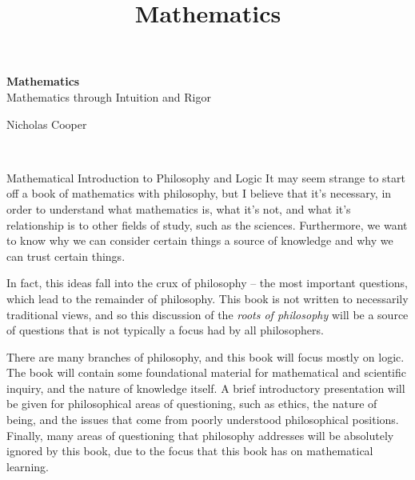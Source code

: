 \documentclass[11pt,twoside,letterpaper,fleqn,parskip=full]{book}
\begin{document}

\nocite{*}

\begingroup
\thispagestyle{empty}
\centering
\vspace*{5cm}
\par\normalfont\fontsize{35}{35}\sffamily\selectfont
\textbf{Mathematics}\\
{\LARGE Mathematics through Intuition and Rigor}\par %
\vspace*{1cm}
{\Huge Nicholas Cooper}\par %
\endgroup


\title{Mathematics}

\newpage
~\vfill
\thispagestyle{empty}







\tableofcontents %




\begin{part}{Mathematical Introduction to Philosophy and Logic}
    It may seem strange to start off a book of mathematics with philosophy, but I believe that it's necessary, in order to understand what mathematics is, what it's not, and what it's relationship is to other fields of study, such as the sciences. Furthermore, we want to know why we can consider certain things a source of knowledge and why we can trust certain things.
    
    In fact, this ideas fall into the crux of philosophy -- the most important questions, which lead to the remainder of philosophy. This book is not written to necessarily traditional views, and so this discussion of the \emph{roots of philosophy} will be a source of questions that is not typically a focus had by all philosophers.
    
    There are many branches of philosophy, and this book will focus mostly on logic. The book will contain some foundational material for mathematical and scientific inquiry, and the nature of knowledge itself. A brief introductory presentation will be given for philosophical areas of questioning, such as ethics, the nature of being, and the issues that come from poorly understood philosophical positions. Finally, many areas of questioning that philosophy addresses will be absolutely ignored by this book, due to the focus that this book has on mathematical learning.
    
    



\end{part}
\end{document}

